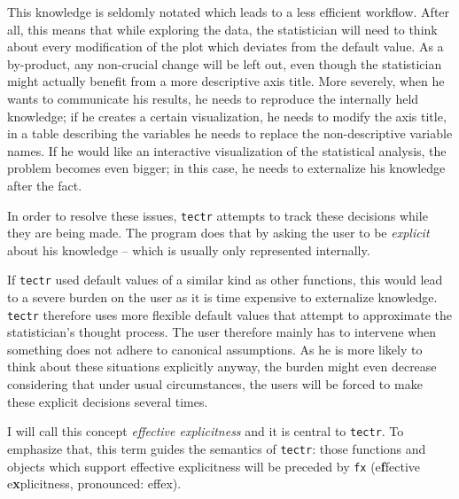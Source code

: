 \documentclass[]{report}
\theoremstyle{definition}
\theoremstyle{definition}
\theoremstyle{definition}
\theoremstyle{remark}
\begin{document}
This knowledge is seldomly notated which leads to a less efficient
workflow. After all, this means that while exploring the data, the
statistician will need to think about every modification of the plot
which deviates from the default value. As a by-product, any non-crucial
change will be left out, even though the statistician might actually
benefit from a more descriptive axis title. More severely, when he wants
to communicate his results, he needs to reproduce the internally held
knowledge; if he creates a certain visualization, he needs to modify the
axis title, in a table describing the variables he needs to replace the
non-descriptive variable names. If he would like an interactive
visualization of the statistical analysis, the problem becomes even
bigger; in this case, he needs to externalize his knowledge after the
fact.

In order to resolve these issues, \texttt{tectr} attempts to track these
decisions while they are being made. The program does that by asking the
user to be \emph{explicit} about his knowledge -- which is usually only
represented internally.

If \texttt{tectr} used default values of a similar kind as other
functions, this would lead to a severe burden on the user as it is time
expensive to externalize knowledge. \texttt{tectr} therefore uses more
flexible default values that attempt to approximate the statistician's
thought process. The user therefore mainly has to intervene when
something does not adhere to canonical assumptions. As he is more likely
to think about these situations explicitly anyway, the burden might even
decrease considering that under usual circumstances, the users will be
forced to make these explicit decisions several times.

I will call this concept \emph{effective explicitness} and it is central
to \texttt{tectr}. To emphasize that, this term guides the semantics of
\texttt{tectr}: those functions and objects which support effective
explicitness will be preceded by \texttt{fx} (e\textbf{f}fective
e\textbf{x}plicitness, pronounced: effex).
\end{document}
